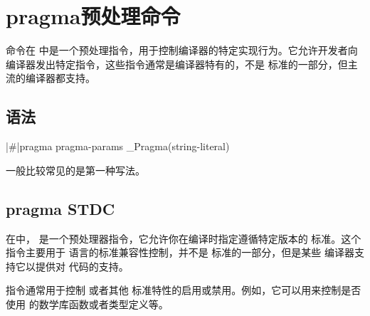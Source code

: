 \chapter{pragma预处理命令}
 命令在 
中是一个预处理指令，用于控制编译器的特定实现行为。它允许开发者向编译器发出特定指令，这些指令通常是编译器特有的，不是
 标准的一部分，但主流的编译器都支持。

\section{语法}
\begin{cpplst}
|\#|pragma pragma-params
_Pragma(string-literal)
\end{cpplst}
一般比较常见的是第一种写法。

\section{pragma STDC}
在中， 是一个预处理器指令，它允许你在编译时指定遵循特定版本的  标准。这个指令主要用于  语言的标准兼容性控制，并不是  标准的一部分，但是某些  编译器支持它以提供对  代码的支持。

 指令通常用于控制  或者其他  标准特性的启用或禁用。例如，它可以用来控制是否使用  的数学库函数或者类型定义等。

